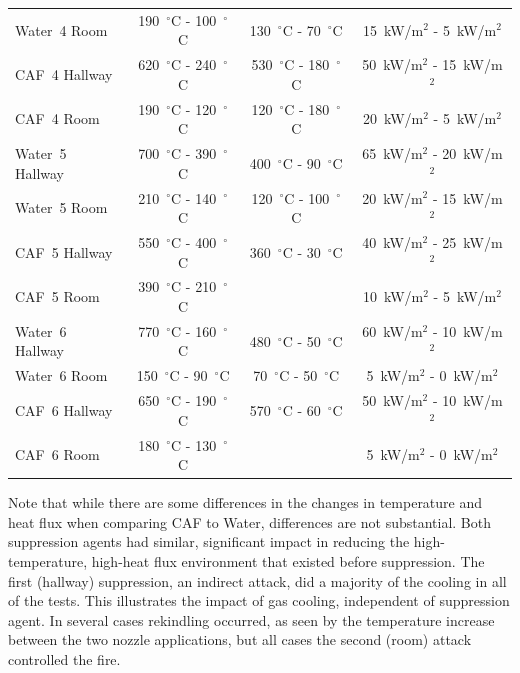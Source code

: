 \documentclass[12pt,oneside]{book}
\begin{document}
\begin{table}[!ht]
\begin{tabular}{lccc}
Water~4 Room     & 190~$^{\circ}$C - 100~$^{\circ}$C   & 130~$^{\circ}$C - 70~$^{\circ}$C    & 15~kW/m$^2$ - 5~kW/m$^2$  \\ [.25cm]
CAF~4 Hallway    & 620~$^{\circ}$C - 240~$^{\circ}$C   & 530~$^{\circ}$C - 180~$^{\circ}$C   & 50~kW/m$^2$ - 15~kW/m$^2$  \\
CAF~4 Room       & 190~$^{\circ}$C - 120~$^{\circ}$C   & 120~$^{\circ}$C - 180~$^{\circ}$C   & 20~kW/m$^2$ - 5~kW/m$^2$  \\ [.25cm]
Water~5 Hallway  & 700~$^{\circ}$C - 390~$^{\circ}$C   & 400~$^{\circ}$C - 90~$^{\circ}$C    & 65~kW/m$^2$ - 20~kW/m$^2$  \\
Water~5 Room     & 210~$^{\circ}$C - 140~$^{\circ}$C   & 120~$^{\circ}$C - 100~$^{\circ}$C   & 20~kW/m$^2$ - 15~kW/m$^2$  \\ [.25cm]
CAF~5 Hallway    & 550~$^{\circ}$C - 400~$^{\circ}$C   & 360~$^{\circ}$C - 30~$^{\circ}$C    & 40~kW/m$^2$ - 25~kW/m$^2$  \\
CAF~5 Room       & 390~$^{\circ}$C - 210~$^{\circ}$C   &                                     & 10~kW/m$^2$ - 5~kW/m$^2$  \\ [.25cm]
Water~6 Hallway  & 770~$^{\circ}$C - 160~$^{\circ}$C   & 480~$^{\circ}$C - 50~$^{\circ}$C    & 60~kW/m$^2$ - 10~kW/m$^2$  \\
Water~6 Room     & 150~$^{\circ}$C - 90~$^{\circ}$C    & 70~$^{\circ}$C - 50~$^{\circ}$C     & 5~kW/m$^2$ - 0~kW/m$^2$  \\ [.25cm]
CAF~6 Hallway    & 650~$^{\circ}$C - 190~$^{\circ}$C   & 570~$^{\circ}$C - 60~$^{\circ}$C    & 50~kW/m$^2$ - 10~kW/m$^2$  \\
CAF~6 Room       & 180~$^{\circ}$C - 130~$^{\circ}$C   &                                     & 5~kW/m$^2$ - 0~kW/m$^2$  \\ [.25cm]
\bottomrule[1.25pt]
\end{tabular}\par
\end{table}

Note that while there are some differences in the changes in temperature and heat flux when comparing CAF to Water, differences are not substantial. Both suppression agents had similar, significant impact in reducing the high-temperature, high-heat flux environment that existed before suppression. The first (hallway) suppression, an indirect attack, did a majority of the cooling in all of the tests. This illustrates the impact of gas cooling, independent of suppression agent. In several cases rekindling occurred, as seen by the temperature increase between the two nozzle applications, but all cases the second (room) attack controlled the fire.
\end{document}
